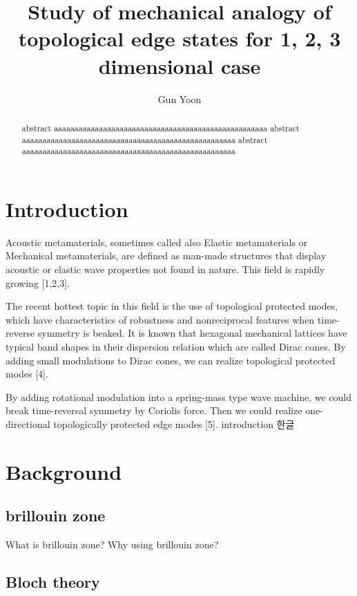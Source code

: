 \documentclass[a4paper]{article}
\title{Study of mechanical analogy of topological edge states for 1, 2, 3 dimensional case}
\author{Gun Yoon}
\begin{document}
\maketitle
\begin{abstract}
    abstract aaaaaaaaaaaaaaaaaaaaaaaaaaaaaaaaaaaaaaaaaaaaaaaaaaaa
    abstract aaaaaaaaaaaaaaaaaaaaaaaaaaaaaaaaaaaaaaaaaaaaaaaaaaaa
    abstract aaaaaaaaaaaaaaaaaaaaaaaaaaaaaaaaaaaaaaaaaaaaaaaaaaaa
\end{abstract}


\begin{multicols*}{2}

    \section{Introduction}
    Acoustic metamaterials, sometimes called also Elastic metamaterials or Mechanical
    metamaterials, are defined as man-made structures that display acoustic or elastic wave properties not found in nature. This field
    is rapidly growing [1,2,3].

    The recent hottest topic in this field is the use of topological protected modes, which have characteristics of
    robustness and nonreciprocal features when time-reverse symmetry is beaked. It is known that hexagonal
    mechanical lattices have typical band shapes in their dispersion relation which are called Dirac cones. By
    adding small modulations to Dirac cones, we can realize topological protected modes [4].

    By adding rotational modulation into a spring-mass type wave machine, we could break time-reversal
    symmetry by Coriolis force. Then we could realize one-directional topologically protected edge modes [5].
    introduction
    한글

    \section{Background}

    \subsection{brillouin zone}

    What is brillouin zone?
    Why using brillouin zone?

    \subsection{Bloch theory}


\end{multicols*}
\end{document}
